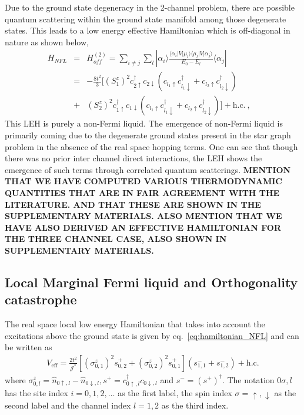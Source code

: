 \documentclass[reprint,prb,superscriptaddress]{revtex4-2}
\begin{document}
Due to the ground state degeneracy in the 2-channel problem, there are possible quantum scattering within the ground state manifold among those degenerate states. This leads to a low energy effective Hamiltonian which is off-diagonal in nature as shown below,
\begin{eqnarray}
H_{NFL}&=&H^{(2)}_{off} = \sum_{i\neq j} \sum_l |\alpha_i\rangle \frac{\langle \alpha_i  | V| \mu_l \rangle \langle \mu_l  | V| \alpha_j \rangle}{E_0-E_{l}}\langle \alpha_j | \nonumber\\
&=& -\frac{8t^2}{3} [ (S_1^z)^2 c_{2\uparrow}^{\dagger}c_{2\downarrow}  (  c_{l_1\uparrow}c_{l_1\downarrow}^{\dagger} +  c_{l_2\uparrow}c_{l_2\downarrow}^{\dagger}  ) \nonumber\\
&+& (S_2^z)^2 c_{1\uparrow}^{\dagger}c_{1\downarrow}  (  c_{l_1\uparrow}c_{l_1\downarrow}^{\dagger} +  c_{l_2\uparrow}c_{l_2\downarrow}^{\dagger}  ) ] + \textrm{h.c.} ~,~~~~
\label{eq:hamiltonian_NFL}
\end{eqnarray}
This LEH is purely a non-Fermi liquid. The emergence of non-Fermi liquid is primarily coming due to the degenerate ground states present in the star graph problem in the absence of the real space hopping terms. One can see that though there was no prior inter channel direct interactions, the LEH shows the emergence of such terms through correlated quantum scatterings. \textbf{MENTION THAT WE HAVE COMPUTED VARIOUS THERMODYNAMIC QUANTITIES THAT ARE IN FAIR AGREEMENT WITH THE LITERATURE. AND THAT THESE ARE SHOWN IN THE SUPPLEMENTARY MATERIALS. ALSO MENTION THAT WE HAVE ALSO DERIVED AN EFFECTIVE HAMILTONIAN FOR THE THREE CHANNEL CASE, ALSO SHOWN IN SUPPLEMENTARY MATERIALS.}


\subsection{Local Marginal Fermi liquid and Orthogonality catastrophe}
The real space local low energy Hamiltonian that takes into account the excitations above the ground state is given by eq.~\ref{eq:hamiltonian_NFL} and can be written as
\begin{equation}\begin{aligned}
	\label{nfl_terms}
	V_\text{eff} = \frac{2t^2}{{\mathcal{J}^*}}\left[\left(\sigma^z_{0,1}\right)^2 s^+_{0,2} + \left(\sigma^z_{0,2}\right)^2 s^+_{0,1}\right] \left(s^-_{1,1} + s^-_{1,2}\right) + \text{h.c.}
\end{aligned}\end{equation}
where \(\sigma^z_{0,l} = \hat n_{0\uparrow,l} - \hat n_{0\downarrow,l}, s^+ = c^\dagger_{0 \uparrow,l}c_{0 \downarrow,l}\) and \(s^- = \left(s^+\right)^\dagger\). The notation \(0\sigma,l\) has the site index \(i=0,1,2,\ldots\) as the first label, the spin index \(\sigma=\uparrow,\downarrow\) as the second label and the channel index \(l=1,2\) as the third index.
\end{document}
